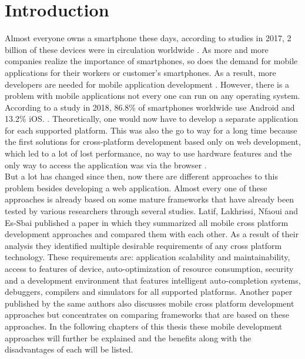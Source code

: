\documentclass[Bachelor,BIF,english]{twbook}
\begin{document}
\chapter{Introduction}
Almost everyone owns a smartphone these days, according to studies in 2017, 2 billion of these devices were in circulation worldwide \cite[p.~184]{MartinezLecomte2017}. As more and more companies realize the importance of smartphones, so does the demand for mobile applications for their workers or customer's smartphones. As a result, more developers are needed for mobile application development \cite{GaouarBenamarBendimerad2016} \cite{Danielsson_2016}.
However, there is a problem with mobile applications not every one can run on any operating system. According to a study \cite{OSMarketShare} in 2018, 86.8\% of smartphones worldwide use Android and 13.2\% iOS. \cite[p.~5]{Steczko2016}. Theoretically, one would now have to develop a separate application for each supported platform. This was also the go to way for a long time because the first solutions for cross-platform development based only on web development, which led to a lot of lost performance, no way to use hardware features and the only way to access the application was via the browser \cite[p.~626]{6420693} \cite[p.~1]{7934674}.
\\[\baselineskip]
But a lot has changed since then, now there are different approaches to this problem besides developing a web application. Almost every one of these approaches is already based on some mature frameworks that have already been tested by various researchers through several studies. Latif, Lakhrissi, Nfaoui and Es-Sbai published a paper \cite{7479278} in which they summarized all mobile cross platform development approaches and compared them with each other. As a result of their analysis they identified multiple desirable requirements of any cross platform technology. These requirements are: application scalability and maintainability, access to features of device, auto-optimization of resource consumption, security and a development environment that features intelligent auto-completion systems, debuggers, compilers and simulators for all supported platforms. Another paper \cite{7934674} published by the same authors also discusses mobile cross platform development approaches but concentrates on comparing frameworks that are based on these approaches. In the following chapters of this thesis these mobile development approaches will further be explained and the benefits along with the disadvantages of each will be listed.
\\[\baselineskip]
\end{document}
